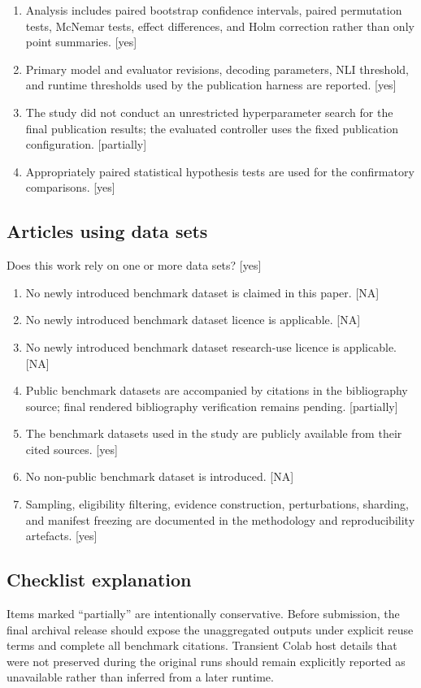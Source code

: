 \documentclass[manuscript, screen, review]{jair}
\begin{document}
\begin{enumerate}
\item Analysis includes paired bootstrap confidence intervals, paired permutation tests, McNemar tests, effect differences, and Holm correction rather than only point summaries. [yes]
\item Primary model and evaluator revisions, decoding parameters, NLI threshold, and runtime thresholds used by the publication harness are reported. [yes]
\item The study did not conduct an unrestricted hyperparameter search for the final publication results; the evaluated controller uses the fixed publication configuration. [partially]
\item Appropriately paired statistical hypothesis tests are used for the confirmatory comparisons. [yes]
\end{enumerate}

\subsection*{Articles using data sets}
Does this work rely on one or more data sets? [yes]
\begin{enumerate}
\item No newly introduced benchmark dataset is claimed in this paper. [NA]
\item No newly introduced benchmark dataset licence is applicable. [NA]
\item No newly introduced benchmark dataset research-use licence is applicable. [NA]
\item Public benchmark datasets are accompanied by citations in the bibliography source; final rendered bibliography verification remains pending. [partially]
\item The benchmark datasets used in the study are publicly available from their cited sources. [yes]
\item No non-public benchmark dataset is introduced. [NA]
\item Sampling, eligibility filtering, evidence construction, perturbations, sharding, and manifest freezing are documented in the methodology and reproducibility artefacts. [yes]
\end{enumerate}

\subsection*{Checklist explanation}
Items marked ``partially'' are intentionally conservative. Before submission,
the final archival release should expose the unaggregated outputs under explicit
reuse terms and complete all benchmark citations. Transient Colab host details
that were not preserved during the original runs should remain explicitly
reported as unavailable rather than inferred from a later runtime.
\end{document}
